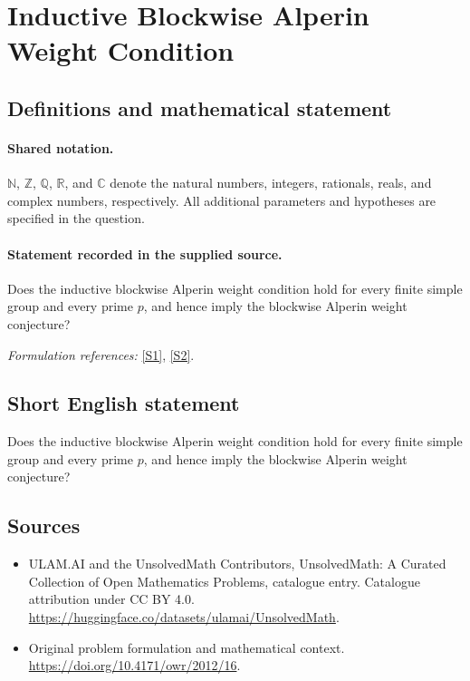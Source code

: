 \documentclass[11pt]{article}
\newcommand{\sref}[2]{\hyperlink{source:#1:#2}{[S#2]}}
\begin{document}
\section{Inductive Blockwise Alperin Weight Condition}\label{statement}

\subsection{Definitions and mathematical statement}

\paragraph{Shared notation.}$\mathbb N$, $\mathbb Z$, $\mathbb Q$, $\mathbb R$, and $\mathbb C$ denote the natural numbers, integers, rationals, reals, and complex numbers, respectively. All additional parameters and hypotheses are specified in the question.


\paragraph{Statement recorded in the supplied source.}
Does the inductive blockwise Alperin weight condition hold for every finite simple group and every prime $p$, and hence imply the blockwise Alperin weight conjecture?
\par\smallskip\textit{Formulation references:} \sref{statement}{1}, \sref{statement}{2}.
\subsection{Short English statement}
Does the inductive blockwise Alperin weight condition hold for every finite simple group and every prime $p$, and hence imply the blockwise Alperin weight conjecture?
\subsection{Sources}
\begin{itemize}
\item[\hypertarget{source:statement:1}{S1}] ULAM.AI and the UnsolvedMath Contributors, UnsolvedMath: A Curated Collection of Open Mathematics Problems, catalogue entry. Catalogue attribution under CC BY 4.0.
\url{https://huggingface.co/datasets/ulamai/UnsolvedMath}.
\item[\hypertarget{source:statement:2}{S2}] Original problem formulation and mathematical context.
\url{https://doi.org/10.4171/owr/2012/16}.
\end{itemize}
\label{end:statement}
\end{document}
